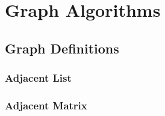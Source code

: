\section{Graph Algorithms}

\subsection{Graph Definitions}

\subsubsection{Adjacent List}



\subsubsection{Adjacent Matrix}


